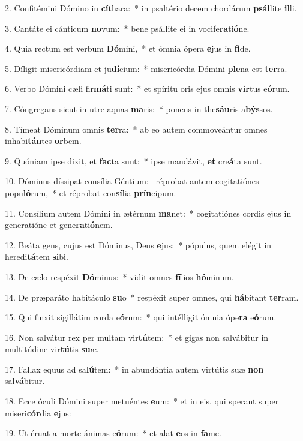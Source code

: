 2. Confitémini Dómino in \textbf{cí}thara:~*  in psaltério decem chordárum \textbf{psál}lite \textbf{il}li.\

3. Cantáte ei cánticum \textbf{no}vum:~*  bene psállite ei in vocife\textbf{ra}ti\textbf{ó}ne.\

4. Quia rectum est verbum \textbf{Dó}mini,~*  et ómnia ópera \textbf{e}jus in \textbf{fi}de.\

5. Díligit misericórdiam et ju\textbf{dí}cium:~*  misericórdia Dómini \textbf{ple}na est \textbf{ter}ra.\

6. Verbo Dómini cæli fir\textbf{má}ti sunt:~*  et spíritu oris ejus omnis \textbf{vir}tus e\textbf{ó}rum.\

7. Cóngregans sicut in utre aquas \textbf{ma}ris:~*  ponens in the\textbf{sáu}ris a\textbf{býs}sos.\

8. Tímeat Dóminum omnis \textbf{ter}ra:~*  ab eo autem commoveántur omnes inhabi\textbf{tán}tes \textbf{or}bem.\

9. Quóniam ipse dixit, et \textbf{fac}ta sunt:~*  ipse mandávit, \textbf{et} cre\textbf{á}ta sunt.\

10. Dóminus díssipat consília Géntium: \dag\  réprobat autem cogitatiónes popu\textbf{ló}rum,~*  et réprobat con\textbf{sí}lia \textbf{prín}cipum.\

11. Consílium autem Dómini in ætérnum \textbf{ma}net:~*  cogitatiónes cordis ejus in generatióne et gene\textbf{ra}ti\textbf{ó}nem.\

12. Beáta gens, cujus est Dóminus, Deus \textbf{e}jus:~*  pópulus, quem elégit in heredi\textbf{tá}tem \textbf{si}bi.\

13. De cælo respéxit \textbf{Dó}minus:~*  vidit omnes \textbf{fí}lios \textbf{hó}minum.\

14. De præparáto habitáculo \textbf{su}o~*  respéxit super omnes, qui \textbf{há}bitant \textbf{ter}ram.\

15. Qui finxit sigillátim corda e\textbf{ó}rum:~*  qui intélligit ómnia ópe\textbf{ra} e\textbf{ó}rum.\

16. Non salvátur rex per multam vir\textbf{tú}tem:~*  et gigas non salvábitur in multitúdine vir\textbf{tú}tis \textbf{su}æ.\

17. Fallax equus ad sa\textbf{lú}tem:~*  in abundántia autem virtútis suæ \textbf{non} sal\textbf{vá}bitur.\

18. Ecce óculi Dómini super metuéntes \textbf{e}um:~*  et in eis, qui sperant super miseri\textbf{cór}dia \textbf{e}jus:\

19. Ut éruat a morte ánimas e\textbf{ó}rum:~*  et alat \textbf{e}os in \textbf{fa}me.\

